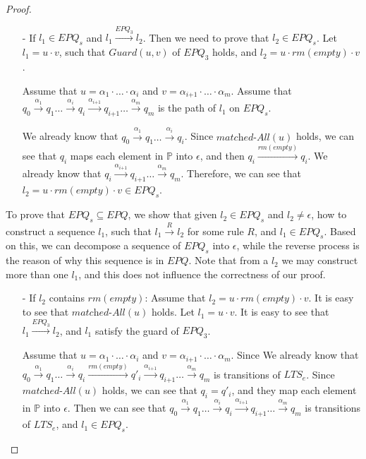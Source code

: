 \begin {proof}
\begin{itemize}
\item[-] If $l_1 \in \textit{EPQ}_s$ and $l_1 \xrightarrow{\textit{EPQ}_3} l_2$. Then we need to prove that $l_2 \in \textit{EPQ}_s$. Let $l_1 = u \cdot v$, such that $\textit{Guard}(u,v)$ of $\textit{EPQ}_3$ holds, and $l_2 = u \cdot \textit{rm}(\textit{empty}) \cdot v$.

    Assume that $u = \alpha_1 \cdot \ldots \cdot \alpha_i$ and $v = \alpha_{\textit{i+1}} \cdot \ldots \cdot \alpha_m$. Assume that $q_0 \xrightarrow{\alpha_1} q_1 \ldots \xrightarrow{\alpha_i} q_i \xrightarrow{\alpha_{\textit{i+1}}} q_{\textit{i+1}} \ldots  \xrightarrow{\alpha_m} q_m$ is the path of $l_1$ on $\textit{EPQ}_s$.

    We already know that $q_0 \xrightarrow{\alpha_1} q_1 \ldots \xrightarrow{\alpha_i} q_i$. Since $\textit{matched-All}(u)$ holds, we can see that $q_i$ maps each element in $\mathbb{P}$ into $\epsilon$, and then $q_i \xrightarrow{\textit{rm}(\textit{empty})} q_i$. We already know that $q_i \xrightarrow{\alpha_{\textit{i+1}}} q_{\textit{i+1}} \ldots \xrightarrow{\alpha_m} q_m$. Therefore, we can see that $l_2 = u \cdot \textit{rm}(\textit{empty}) \cdot v \in \textit{EPQ}_s$.
\end{itemize}

To prove that $\textit{EPQ}_s \subseteq \textit{EPQ}$, we show that given $l_2 \in \textit{EPQ}_s$ and $l_2 \neq \epsilon$, how to construct a sequence $l_1$, such that $l_1 \xrightarrow{R} l_2$ for some rule $R$, and $l_1 \in \textit{EPQ}_s$. Based on this, we can decompose a sequence of $\textit{EPQ}_s$ into $\epsilon$, while the reverse process is the reason of why this sequence is in $\textit{EPQ}$. Note that from a $l_2$ we may construct more than one $l_1$, and this does not influence the correctness of our proof.

\begin{itemize}
\setlength{\itemsep}{0.5pt}
\item[-] If $l_2$ contains $\textit{rm}(\textit{empty})$: Assume that $l_2 = u \cdot \textit{rm}(\textit{empty}) \cdot v$. It is easy to see that $\textit{matched-All}(u)$ holds. Let $l_1 = u \cdot v$. It is easy to see that $l_1 \xrightarrow{\textit{EPQ}_3} l_2$, and $l_1$ satisfy the guard of $\textit{EPQ}_3$.

    Assume that $u = \alpha_1 \cdot \ldots \cdot \alpha_i$ and $v = \alpha_{\textit{i+1}} \cdot \ldots \cdot \alpha_m$. Since We already know that $q_0 \xrightarrow{\alpha_1} q_1 \ldots \xrightarrow{\alpha_i} q_i \xrightarrow{\textit{rm}(\textit{empty})} q'_i \xrightarrow{\alpha_{\textit{i+1}}} q_{\textit{i+1}} \ldots  \xrightarrow{\alpha_m} q_m$ is transitions of $\textit{LTS}_e$. Since $\textit{matched-All}(u)$ holds, we can see that $q_i = q'_i$, and they map each element in $\mathbb{P}$ into $\epsilon$. Then we can see that $q_0 \xrightarrow{\alpha_1} q_1 \ldots \xrightarrow{\alpha_i} q_i \xrightarrow{\alpha_{\textit{i+1}}} q_{\textit{i+1}} \ldots  \xrightarrow{\alpha_m} q_m$ is transitions of $\textit{LTS}_e$, and $l_1 \in \textit{EPQ}_s$.


\end{itemize}
\end{proof}
